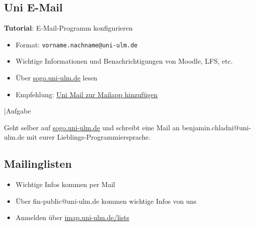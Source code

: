 \documentclass[
	aspectratio=169, 
	10pt 
]{beamer}
\begin{document}
\subsection{Uni E-Mail}
\begin{frame}{\insertsubsection}
    \begin{fancycolumns}[T, widths={30}]
        \begin{center}
            \textbf{Tutorial}: E-Mail-Programm konfigurieren
        \end{center}    
        \nextcolumn
        \begin{itemize}
            \item Format: \lstinline|vorname.nachname@uni-ulm.de|
            \item Wichtige Informationen und Benachrichtigungen von Moodle, LFS, etc.
            \item Über \underline{\href{https://sogo.uni-ulm.de}{sogo.uni-ulm.de}} lesen
            \item Empfehlung: \underline{\href{https://www.uni-ulm.de/einrichtungen/kiz/service-katalog/e-mail-kalender-zusammenarbeit/e-mail/e-mail-programme-konfigurieren/}{Uni Mail zur Mailapp hinzufügen}}
        \end{itemize}
    \end{fancycolumns}
\end{frame}

\begin{frame}{\insertsubsection \space|\space Aufgabe}
    \begin{center} 
        {\large Geht selber auf \href{https://sogo.uni-ulm.de}{sogo.uni-ulm.de} und schreibt eine Mail an benjamin.chladni@uni-ulm.de mit eurer Lieblings-Programmiersprache.} 
    \end{center}
\end{frame}

\subsection{Mailinglisten}
\begin{frame}{\insertsubsection}
    \begin{fancycolumns}[T, widths={70}]
        \begin{itemize}
            \item Wichtige Infos kommen per Mail
            \item Über fin-public@uni-ulm.de kommen wichtige Infos von uns
            \item Anmelden über \href{https://imap.uni-ulm.de/lists}{imap.uni-ulm.de/lists}
        \end{itemize}    
        \nextcolumn
    \end{fancycolumns}

\end{frame}
\end{document}
